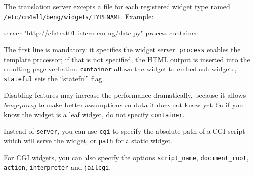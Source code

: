 \documentclass[a4paper,12pt]{article}
\begin{document}
The translation server excepts a file for each registered widget type
named \texttt{/etc/cm4all/beng/widgets/TYPENAME}.  Example:

\begin{verbatim*}
server "http://cfatest01.intern.cm-ag/date.py"
process
container
\end{verbatim*}

The first line is mandatory: it specifies the widget server.
\texttt{process} enables the template processor; if that is not
specified, the HTML output is inserted into the resulting page
verbatim.  \texttt{container} allows the widget to embed sub widgets,
\texttt{stateful} sets the ``stateful'' flag.

Disabling features may increase the performance dramatically, because
it allows \emph{beng-proxy} to make better assumptions on data it does
not know yet.  So if you know the widget is a leaf widget, do not
specify \texttt{container}.

Instead of \texttt{server}, you can use \texttt{cgi} to specify the
absolute path of a CGI script which will serve the widget, or
\texttt{path} for a static widget.

For CGI widgets, you can also specify the options
\texttt{script\_name}, \texttt{document\_root}, \texttt{action},
\texttt{interpreter} and \texttt{jailcgi}.
\end{document}
